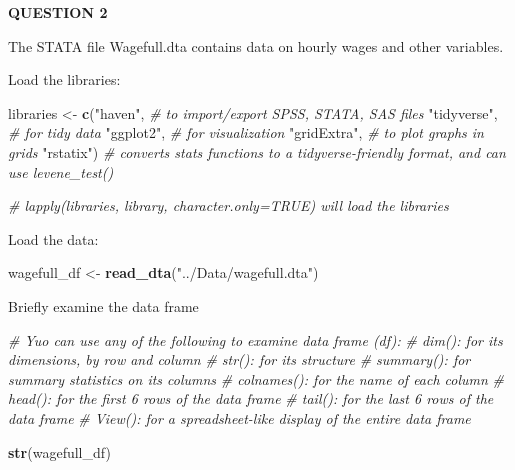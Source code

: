 \documentclass[
]{article}
\newenvironment{Shaded}{\begin{snugshade}}{\end{snugshade}}
\newcommand{\CommentTok}[1]{\textcolor[rgb]{0.56,0.35,0.01}{\textit{#1}}}
\newcommand{\FunctionTok}[1]{\textcolor[rgb]{0.13,0.29,0.53}{\textbf{#1}}}
\newcommand{\NormalTok}[1]{#1}
\newcommand{\OtherTok}[1]{\textcolor[rgb]{0.56,0.35,0.01}{#1}}
\newcommand{\StringTok}[1]{\textcolor[rgb]{0.31,0.60,0.02}{#1}}
\begin{document}
\textbf{QUESTION 2}

The STATA file Wagefull.dta contains data on hourly wages and other
variables.

Load the libraries:

\begin{Shaded}
\begin{Highlighting}[]
\NormalTok{libraries }\OtherTok{\textless{}{-}} \FunctionTok{c}\NormalTok{(}\StringTok{"haven"}\NormalTok{,       }\CommentTok{\# to import/export SPSS, STATA, SAS files}
               \StringTok{"tidyverse"}\NormalTok{,   }\CommentTok{\# for tidy data}
               \StringTok{"ggplot2"}\NormalTok{,     }\CommentTok{\# for visualization}
               \StringTok{"gridExtra"}\NormalTok{,   }\CommentTok{\# to plot graphs in grids}
               \StringTok{"rstatix"}\NormalTok{)     }\CommentTok{\# converts stats functions to a tidyverse{-}friendly format, and can use \textasciigrave{}levene\_test()\textasciigrave{}}

\CommentTok{\# lapply(libraries, library, character.only=TRUE) will load the libraries}
\end{Highlighting}
\end{Shaded}

Load the data:

\begin{Shaded}
\begin{Highlighting}[]
\NormalTok{wagefull\_df }\OtherTok{\textless{}{-}} \FunctionTok{read\_dta}\NormalTok{(}\StringTok{"../Data/wagefull.dta"}\NormalTok{)}
\end{Highlighting}
\end{Shaded}

Briefly examine the data frame

\begin{Shaded}
\begin{Highlighting}[]
\CommentTok{\# Yuo can use any of the following to examine data frame (df): }
\CommentTok{\# \textasciigrave{}dim()\textasciigrave{}: for its dimensions, by row and column}
\CommentTok{\# \textasciigrave{}str()\textasciigrave{}: for its structure}
\CommentTok{\# \textasciigrave{}summary()\textasciigrave{}: for summary statistics on its columns}
\CommentTok{\# \textasciigrave{}colnames()\textasciigrave{}: for the name of each column}
\CommentTok{\# \textasciigrave{}head()\textasciigrave{}: for the first 6 rows of the data frame}
\CommentTok{\# \textasciigrave{}tail()\textasciigrave{}: for the last 6 rows of the data frame}
\CommentTok{\# \textasciigrave{}View()\textasciigrave{}: for a spreadsheet{-}like display of the entire data frame}

\FunctionTok{str}\NormalTok{(wagefull\_df)}
\end{Highlighting}
\end{Shaded}
\end{document}
